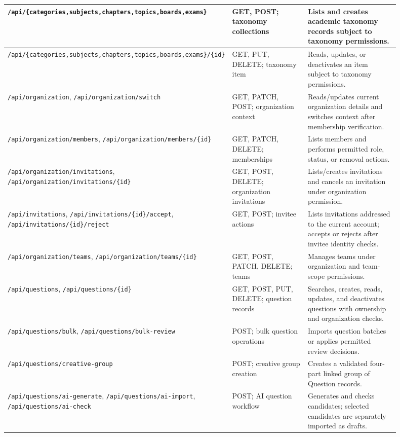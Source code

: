 \begin{table}[H]
\begin{tabular}{|p{0.34\linewidth}|p{0.25\linewidth}|p{0.31\linewidth}|}
        \hline
        \texttt{/api/\{categories,subjects,chapters,topics,boards,exams\}} & GET, POST; taxonomy collections & Lists and creates academic taxonomy records subject to taxonomy permissions. \\
        \hline
        \texttt{/api/\{categories,subjects,chapters,topics,boards,exams\}/\{id\}} & GET, PUT, DELETE; taxonomy item & Reads, updates, or deactivates an item subject to taxonomy permissions. \\
        \hline
        \texttt{/api/organization}, \texttt{/api/organization/switch} & GET, PATCH, POST; organization context & Reads/updates current organization details and switches context after membership verification. \\
        \hline
        \texttt{/api/organization/members}, \texttt{/api/organization/members/\{id\}} & GET, PATCH, DELETE; memberships & Lists members and performs permitted role, status, or removal actions. \\
        \hline
        \texttt{/api/organization/invitations}, \texttt{/api/organization/invitations/\{id\}} & GET, POST, DELETE; organization invitations & Lists/creates invitations and cancels an invitation under organization permission. \\
        \hline
        \texttt{/api/invitations}, \texttt{/api/invitations/\{id\}/accept}, \texttt{/api/invitations/\{id\}/reject} & GET, POST; invitee actions & Lists invitations addressed to the current account; accepts or rejects after invitee identity checks. \\
        \hline
        \texttt{/api/organization/teams}, \texttt{/api/organization/teams/\{id\}} & GET, POST, PATCH, DELETE; teams & Manages teams under organization and team-scope permissions. \\
        \hline
        \texttt{/api/questions}, \texttt{/api/questions/\{id\}} & GET, POST, PUT, DELETE; question records & Searches, creates, reads, updates, and deactivates questions with ownership and organization checks. \\
        \hline
        \texttt{/api/questions/bulk}, \texttt{/api/questions/bulk-review} & POST; bulk question operations & Imports question batches or applies permitted review decisions. \\
        \hline
        \texttt{/api/questions/creative-group} & POST; creative group creation & Creates a validated four-part linked group of Question records. \\
        \hline
        \texttt{/api/questions/ai-generate}, \texttt{/api/questions/ai-import}, \texttt{/api/questions/ai-check} & POST; AI question workflow & Generates and checks candidates; selected candidates are separately imported as drafts. \\

\end{tabular}
\end{table}
